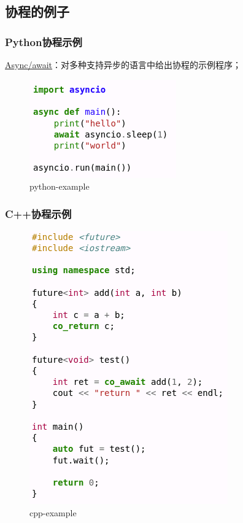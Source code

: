 \subsection{协程的例子}
% 
\begin{frame}[fragile]
    \frametitle{Python协程示例}
% 
\href{https://en.wikipedia.org/wiki/Async/await}{Async/await}：对多种支持异步的语言中给出协程的示例程序；
% 
% 
% 
	\begin{figure}
		\centering
		\includegraphics[width=0.5\linewidth]{figs/python-example.png}
		\caption{python-example}
	\end{figure}


% 

\end{frame}
\begin{frame}[fragile]
    \frametitle{C++协程示例}
% 
	\begin{figure}
		\centering
		\includegraphics[width=0.35\linewidth]{figs/cpp-example.png}
		\caption{cpp-example}
	\end{figure}


% 

\end{frame}
